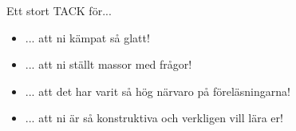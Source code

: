 \documentclass{lecturenotes}
\begin{document}

\begin{Slide}{Ett stort TACK för...}
\begin{itemize}
\item ... att ni kämpat så glatt!
\item ... att ni ställt massor med frågor!
\item ... att det har varit så hög närvaro på föreläsningarna!
\item ... att ni är så konstruktiva och verkligen vill lära er!
\end{itemize}
\vspace{2em} \pause

\end{Slide}
\end{document}
